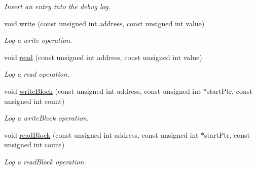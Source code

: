 \begin{CompactItemize}
\begin{CompactList}\small\item\em Insert an entry into the debug log. \item\end{CompactList}\item 
\hypertarget{classmprace_1_1Logger_a6}{
void \hyperlink{classmprace_1_1Logger_a6}{write} (const unsigned int address, const unsigned int value)}
\label{classmprace_1_1Logger_a6}

\begin{CompactList}\small\item\em Log a write operation. \item\end{CompactList}\item 
\hypertarget{classmprace_1_1Logger_a7}{
void \hyperlink{classmprace_1_1Logger_a7}{read} (const unsigned int address, const unsigned int value)}
\label{classmprace_1_1Logger_a7}

\begin{CompactList}\small\item\em Log a read operation. \item\end{CompactList}\item 
\hypertarget{classmprace_1_1Logger_a8}{
void \hyperlink{classmprace_1_1Logger_a8}{write\-Block} (const unsigned int address, const unsigned int $\ast$start\-Ptr, const unsigned int count)}
\label{classmprace_1_1Logger_a8}

\begin{CompactList}\small\item\em Log a write\-Block operation. \item\end{CompactList}\item 
\hypertarget{classmprace_1_1Logger_a9}{
void \hyperlink{classmprace_1_1Logger_a9}{read\-Block} (const unsigned int address, const unsigned int $\ast$start\-Ptr, const unsigned int count)}
\label{classmprace_1_1Logger_a9}

\begin{CompactList}\small\item\em Log a read\-Block operation. \item\end{CompactList}\end{CompactItemize}
